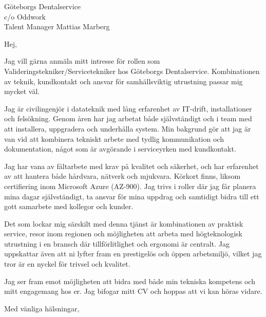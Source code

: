 \documentclass[a4paper,11pt]{letter}
\date{\today}
\begin{document}
\begin{letter}{Göteborgs Dentalservice\\c/o Oddwork\\Talent Manager Mattias Marberg}

\opening{Hej,}

Jag vill gärna anmäla mitt intresse för rollen som Valideringstekniker/Servicetekniker hos Göteborgs Dentalservice. Kombinationen av teknik, kundkontakt och ansvar för samhällsviktig utrustning passar mig mycket väl.

Jag är civilingenjör i datateknik med lång erfarenhet av IT-drift, installationer och felsökning. Genom åren har jag arbetat både självständigt och i team med att installera, uppgradera och underhålla system. Min bakgrund gör att jag är van vid att kombinera tekniskt arbete med tydlig kommunikation och dokumentation, något som är avgörande i serviceyrken med kundkontakt.

Jag har vana av fältarbete med krav på kvalitet och säkerhet, och har erfarenhet av att hantera både hårdvara, nätverk och mjukvara. Körkort finns, liksom certifiering inom Microsoft Azure (AZ-900). Jag trivs i roller där jag får planera mina dagar självständigt, ta ansvar för mina uppdrag och samtidigt bidra till ett gott samarbete med kollegor och kunder. 

Det som lockar mig särskilt med denna tjänst är kombinationen av praktisk service, resor inom regionen och möjligheten att arbeta med högteknologisk utrustning i en bransch där tillförlitlighet och ergonomi är centralt. Jag uppskattar även att ni lyfter fram en prestigelös och öppen arbetsmiljö, vilket jag tror är en nyckel för trivsel och kvalitet.

Jag ser fram emot möjligheten att bidra med både min tekniska kompetens och mitt engagemang hos er. Jag bifogar mitt CV och hoppas att vi kan höras vidare. 

\closing{Med vänliga hälsningar,}

\end{letter}
\end{document}
